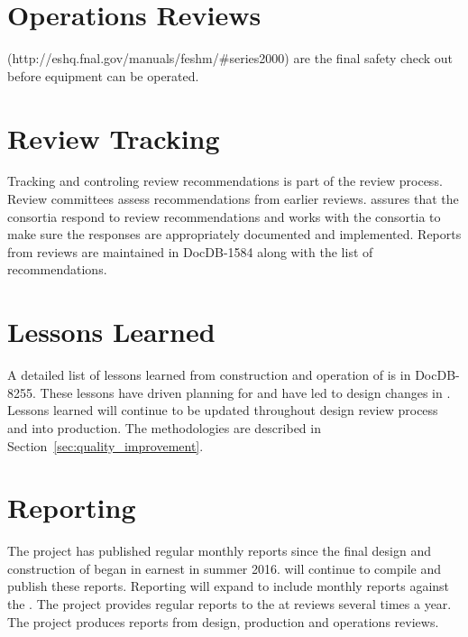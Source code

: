\section{Operations Reviews}

 (http://eshq.fnal.gov/manuals/feshm/\#series2000) are the
final safety check out before equipment can be operated.

\section{Review Tracking}

Tracking and controling review recommendations is part of the review
process. Review committees assess recommendations from earlier
reviews.  assures that the consortia respond to review
recommendations and works with the consortia to make sure the
responses are appropriately documented and implemented. Reports from
 reviews are maintained in DocDB-1584 along with the list
of recommendations.


\section{Lessons Learned}
\label{sec:fdsp-coord-lessons}

A detailed list of lessons learned from construction and operation of
 is in DocDB-8255. These lessons have driven planning for
 and have led to design changes in . Lessons
learned will continue to be updated throughout design review process
and into production. The methodologies are described in
Section~\ref{sec:quality_improvement}. %


\section{Reporting}
\label{sec:fdsp-coord-reporting}

The  project has published regular monthly reports since
the final design and construction of  began in
earnest in summer 2016.  will continue to compile and
publish these reports. Reporting will expand to include monthly
reports against the . The  project provides
regular reports to the  at reviews several times a
year. The  project produces reports from design,
production and operations reviews.
